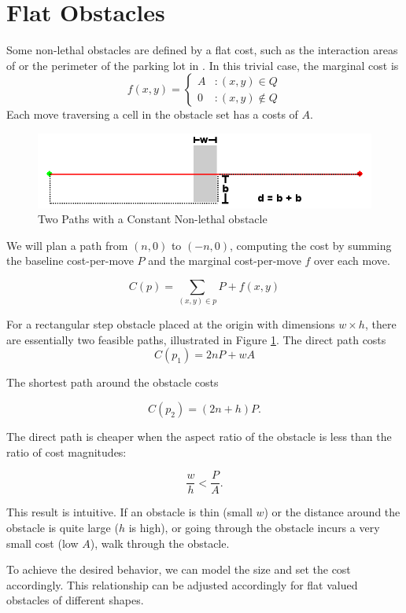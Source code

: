 \section{Flat Obstacles}
Some non-lethal obstacles are defined by a flat cost, such as the interaction areas of \citet{fraichard:anthronav} or the perimeter of the parking lot in \citet{likhachev:costmaps}. In this trivial case, the marginal cost is
\begin{equation}
   \displaystyle
   f(x, y) = \left\{
     \begin{array}{lr}
       A & : (x,y) \in Q\\
       0 & : (x,y) \notin Q
     \end{array}
   \right.
\end{equation}
Each move traversing a cell in the obstacle set has a costs of $A$. 

\begin{figure}[!t]
\includegraphics[width=\columnwidth]{graphix/Constant.png}
\caption{Two Paths with a Constant Non-lethal obstacle}
\label{fig:constant}
\end{figure}

We will plan a path from $(n, 0)$ to $(-n, 0)$, computing the cost by summing the baseline cost-per-move $P$ and the marginal cost-per-move $f$ over each move.

\begin{equation}
C(p) = \sum\limits_{(x,y)\in p} P + f(x, y)
\end{equation}

For a rectangular step obstacle placed at the origin with dimensions $w\times h$, there are essentially two feasible paths, illustrated in Figure \ref{fig:constant}. The direct path costs
\begin{equation}
C(p_1) = 2nP + wA
\end{equation}

The shortest path around the obstacle costs

\begin{equation}
C(p_2) = (2n + h)P.
\end{equation}

The direct path is cheaper when the aspect ratio of the obstacle  is less than the ratio of cost magnitudes:

\begin{equation}
\frac{w}{h} < \frac{P}{A}.
\end{equation}

This result is intuitive. If an obstacle is thin (small $w$) or the distance around the obstacle is quite large ($h$ is high), or going through the obstacle incurs a very small cost (low $A$), walk through the obstacle. 

To achieve the desired behavior, we can model the size and set the cost accordingly. This relationship can be adjusted accordingly for flat valued obstacles of different shapes. 




